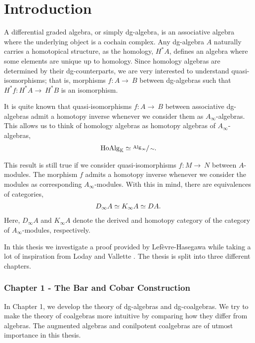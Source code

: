\documentclass[../thesis.tex]{subfiles}
\begin{document}
    \newpage
    
    \section{Introduction}

        A differential graded algebra, or simply dg-algebra, is an associative algebra where the underlying object is a cochain complex. Any dg-algebra $A$ naturally carries a homotopical structure, as the homology, $H^*A$, defines an algebra where some elements are unique up to homology. Since homology algebras are determined by their dg-counterparts, we are very interested to understand quasi-isomorphisms; that is, morphisms $f:A\rightarrow~B$ between dg-algebras such that $H^*f:H^*A\rightarrow~H^*B$ is an isomorphism.

        It is quite known that quasi-isomorphisms $f:A\rightarrow~B$ between associative dg-algebras admit a homotopy inverse whenever we consider them as $A_\infty$-algebras. This allows us to think of homology algebras as homotopy algebras of $A_\infty$-algebras,
        \begin{align*}
            \tt{HoAlg}_\mathbb{K} \simeq \sfrac{\tt{Alg}_\infty}{\sim}\tt{.}
        \end{align*}

        This result is still true if we consider quasi-isomorphisms $f:M\rightarrow~N$ between $A$-modules. The morphism $f$ admits a homotopy inverse whenever we consider the modules as corresponding $A_\infty$-modules. With this in mind, there are equivalences of categories,
        \begin{align*}
            D_\infty A \simeq K_\infty A \simeq DA\tt{.}
        \end{align*}
        Here, $D_\infty A$ and $K_\infty A$ denote the derived and homotopy category of the category of $A_\infty$-modules, respectively.

        In this thesis we investigate a proof provided by Lef\`evre-Hasegawa \cite{LefevreHasegawa03} while taking a lot of inspiration from Loday and Vallette \cite{Loday12}. The thesis is split into three different chapters.

        \subsubsection*{Chapter 1 - The Bar and Cobar Construction}
            In Chapter 1, we develop the theory of dg-algebras and dg-coalgebras. We try to make the theory of coalgebras more intuitive by comparing how they differ from algebras. The augmented algebras and conilpotent coalgebras are of utmost importance in this thesis.
\end{document}
